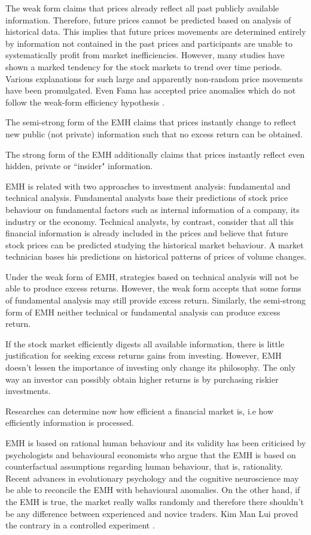 The weak form claims that prices already reflect all past publicly available
information. Therefore, future prices cannot be predicted based on analysis of
historical data. This implies that future prices movements are determined
entirely by information not contained in the past prices and participants are
unable to systematically profit from market inefficiencies.  However, many
studies have shown a marked tendency for the stock markets to trend over time
periods. Various explanations for such large and apparently non-random price
movements have been promulgated. Even Fama has accepted price anomalies which
do not follow the weak-form efficiency hypothesis \cite{fama+french2008}.

The semi-strong form of the EMH claims that prices instantly change to reflect
new public (not private) information such that no excess return can be
obtained. 

The strong form of the EMH additionally claims that prices instantly reflect
even hidden, private or ``insider" information. 

EMH is related with two approaches to investment analysis: fundamental and
technical analysis. Fundamental analysts base their predictions of stock price
behaviour on fundamental factors such as internal information of a company, its
industry or the economy. Technical analysts, by contrast, consider that all
this financial information is already included in the prices and believe that
future stock prices can be predicted studying the historical market behaviour.
A market technician bases his predictions on historical patterns of prices of
volume changes.

Under the weak form of EMH, strategies based on technical analysis will not be
able to produce excess returns. However, the weak form accepts that some forms
of fundamental analysis may still provide excess return. Similarly, the
semi-strong form of EMH  neither technical or fundamental analysis can produce
excess return.

If the stock market efficiently digests all available information, there is
little justification for seeking excess returns gains from investing. However,
EMH doesn't lessen the importance of investing only change its philosophy. The
only way an investor can possibly obtain higher returns is by purchasing
riskier investments.

 Researches can determine now how efficient a financial market is, i.e how
efficiently information is processed.  

EMH is based on rational human behaviour and its validity has been criticised
by psychologists and behavioural economists who argue that the EMH is based on
counterfactual assumptions regarding human behaviour, that is, rationality.
Recent advances in evolutionary psychology and the cognitive neuroscience may
be able to reconcile the EMH with behavioural anomalies. On the other hand, if
the EMH is true, the market really walks randomly and therefore there shouldn't
be any difference between experienced and novice traders. Kim Man Lui proved
the contrary in a controlled experiment \cite{man2013}.

